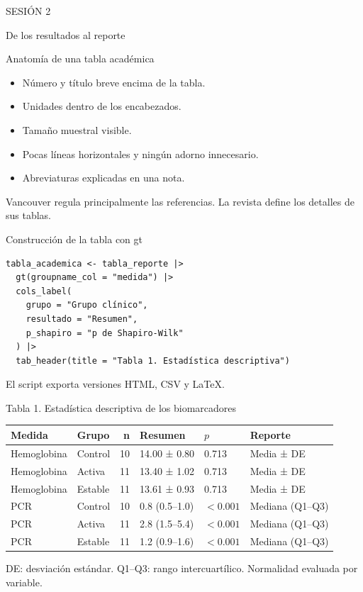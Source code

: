 \documentclass[aspectratio=169,11pt]{beamer}
\begin{document}
\begin{frame}[plain]
\centering
\vfill
{\color{naranja}\fontsize{19}{22}\selectfont SESIÓN 2}\par
\vspace{0.25cm}
{\color{azul}\fontsize{30}{34}\selectfont De los resultados al reporte}\par
\vfill
\end{frame}

\begin{frame}{Anatomía de una tabla académica}
\large
\begin{itemize}
  \item Número y título breve encima de la tabla.
  \item Unidades dentro de los encabezados.
  \item Tamaño muestral visible.
  \item Pocas líneas horizontales y ningún adorno innecesario.
  \item Abreviaturas explicadas en una nota.
\end{itemize}

\vspace{0.5cm}
\small Vancouver regula principalmente las referencias. La revista define los detalles de sus tablas.
\end{frame}

\begin{frame}[fragile]{Construcción de la tabla con gt}
\begin{lstlisting}[basicstyle=\ttfamily\footnotesize]
tabla_academica <- tabla_reporte |>
  gt(groupname_col = "medida") |>
  cols_label(
    grupo = "Grupo clínico",
    resultado = "Resumen",
    p_shapiro = "p de Shapiro-Wilk"
  ) |>
  tab_header(title = "Tabla 1. Estadística descriptiva")
\end{lstlisting}

\small El script exporta versiones HTML, CSV y LaTeX.
\end{frame}

\begin{frame}{Tabla 1. Estadística descriptiva de los biomarcadores}
\scriptsize
\begin{tabular}{llrlll}
\toprule
Medida & Grupo & n & Resumen & $p$ & Reporte\\
\midrule
Hemoglobina & Control & 10 & 14.00 ± 0.80 & 0.713 & Media ± DE\\
Hemoglobina & Activa & 11 & 13.40 ± 1.02 & 0.713 & Media ± DE\\
Hemoglobina & Estable & 11 & 13.61 ± 0.93 & 0.713 & Media ± DE\\
\midrule
PCR & Control & 10 & 0.8 (0.5--1.0) & $<0.001$ & Mediana (Q1--Q3)\\
PCR & Activa & 11 & 2.8 (1.5--5.4) & $<0.001$ & Mediana (Q1--Q3)\\
PCR & Estable & 11 & 1.2 (0.9--1.6) & $<0.001$ & Mediana (Q1--Q3)\\
\bottomrule
\end{tabular}

\vspace{0.35cm}
\footnotesize DE: desviación estándar. Q1--Q3: rango intercuartílico. Normalidad evaluada por variable.
\end{frame}
\end{document}

